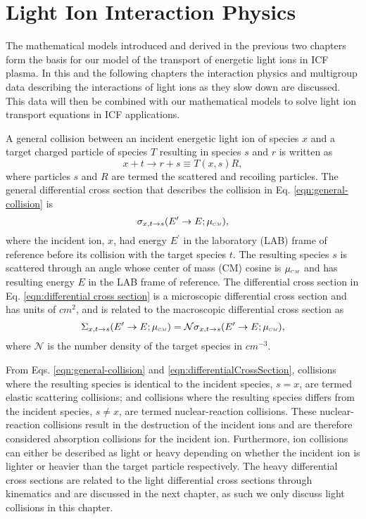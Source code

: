 \documentclass[../main.tex]{subfiles}
\begin{document}
\chapter{Light Ion Interaction Physics}
The mathematical models introduced and derived in the previous two chapters form the basis for our model of the transport of energetic light ions in ICF plasma. In this and the following chapters the interaction physics and multigroup data describing the interactions of light ions as they slow down are discussed. This data will then be combined with our mathematical models to solve light ion transport equations in ICF applications.

A general collision between an incident energetic light ion of species $x$ and a target charged particle of species $T$ resulting in species $s$ and $r$ is written as
\begin{equation} \label{eqn:general-collision}
    x+t \rightarrow r+s \equiv T(x,s)R,
\end{equation}
where particles $s$ and $R$ are termed the scattered and recoiling particles. The general differential cross section that describes the collision in Eq. \eqref{eqn:general-collision} is
\begin{equation} \label{eqn:differentialCrossSection}
    \sigma_{x,t \rightarrow s}(E^{\prime} \rightarrow E; \mucm),
\end{equation}
where the incident ion, $x$, had energy $E^{\prime}$ in the laboratory (LAB) frame of reference before its collision with the target species $t$. The resulting species $s$ is scattered through an angle whose center of mass (CM) cosine is $\mucm$ and has resulting energy $E$ in the LAB frame of reference. The differential cross section in Eq. \eqref{eqn:differential cross section} is a microscopic differential cross section and has units of $cm^{2}$, and is related to the macroscopic differential cross section as
\begin{equation}
    \Sigma_{x,t \rightarrow s}(E^{\prime} \rightarrow E; \mucm) = \mathcal{N} \sigma_{x,t \rightarrow s}(E^{\prime} \rightarrow E; \mucm),
\end{equation}
where $\mathcal{N}$ is the number density of the target species in $cm^{-3}$.

From Eqs. \eqref{eqn:general-collision} and \eqref{eqn:differentialCrossSection}, collisions where the resulting species is identical to the incident species, $s = x$, are termed elastic scattering collisions; and collisions where the resulting species differs from the incident species, $s \neq x$, are termed nuclear-reaction collisions. These nuclear-reaction collisions result in the destruction of the incident ions and are therefore considered absorption collisions for the incident ion. Furthermore, ion collisions can either be described as light or heavy depending on whether the incident ion is lighter or heavier than the target particle respectively. The heavy differential cross sections are related to the light differential cross sections through kinematics and are discussed in the next chapter, as such we only discuss light collisions in this chapter.
\end{document}
